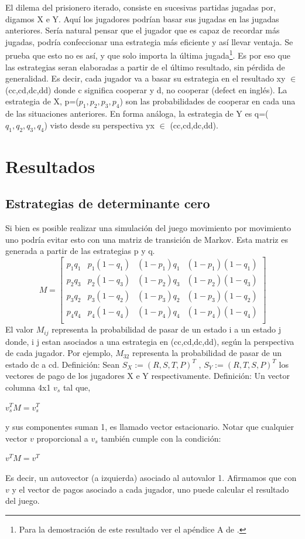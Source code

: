 \documentclass[11pt]{article}
\begin{document}
El dilema del prisionero iterado, consiste en sucesivas partidas jugadas por, digamos X e Y.
Aquí los jugadores podrían basar sus jugadas en las jugadas anteriores. Sería natural pensar que el jugador que es
capaz de recordar más jugadas, podría confeccionar una estrategia más eficiente y así llevar ventaja.
Se prueba que esto no es así, y que solo importa la última jugada\footnote{Para la demostración de este resultado ver el apéndice A de \cite{PR}.}. Es por eso que las estrategias seran elaboradas
a partir de el último resultado, sin pérdida de generalidad.
Es decir, cada jugador va a basar su estrategia en el resultado xy $\in$ (cc,cd,dc,dd) donde c significa cooperar y d, no cooperar 
(defect en inglés). La estrategia de X, p=($p_1,p_2,p_3,p_4$) son las probabilidades de cooperar en cada una de las situaciones 
anteriores. En forma análoga, la estrategia de Y es q=($q_1,q_2,q_3,q_4$) visto desde su perspectiva yx $\in$ (cc,cd,dc,dd).

\section{Resultados}
\subsection{Estrategias de determinante cero}
Si bien es posible realizar una simulación del juego movimiento por movimiento uno podría evitar esto con una matriz
de transición de Markov. Esta matriz es generada a partir de las estrategias p y q.
$$M=
\begin{bmatrix}
 p_1 q_1 &p_1(1-q_1) &(1-p_1)q_1 &(1-p_1)(1-q_1)\\
 p_2 q_3 &p_2(1-q_3) &(1-p_2)q_3 &(1-p_2)(1-q_3)\\
 p_3 q_2 &p_3(1-q_2) &(1-p_3)q_2 &(1-p_3)(1-q_2)\\
 p_4 q_4 &p_4(1-q_4) &(1-p_4)q_4 &(1-p_4)(1-q_4)\\
\end{bmatrix}
$$
El valor $M_{ij}$ representa la probabilidad de pasar de un estado i a un estado j donde, i j estan asociados a una 
estrategia en (cc,cd,dc,dd), según la perspectiva de cada jugador.
Por ejemplo, $M_{32}$ representa la probabilidad de pasar de un estado dc a cd.\newline
Definición: Sean $S_X:=(R,S,T,P)^T$ , $S_Y:=(R,T,S,P)^T$ los vectores de pago de los jugadores X e Y respectivamente.\newline
Definición: Un vector columna 4x1 $v_s$ tal que,
\begin{center}
$v_s^T M = v_s^T$
\end{center}
y sus componentes suman 1, es llamado  vector estacionario.\newline
Notar que cualquier vector $v$ proporcional a $v_s$ también cumple con la condición:
\begin{center}
$v^T M = v^T$
\end{center}
Es decir, un autovector (a izquierda) asociado al autovalor 1.
Afirmamos que con $v$ y el vector de pagos asociado a cada jugador, uno puede calcular el resultado del juego.
\end{document}

